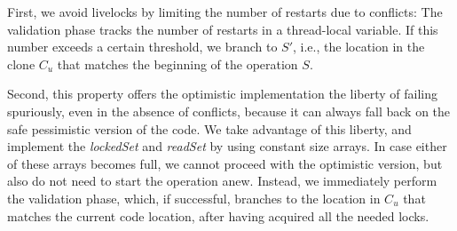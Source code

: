 First, we avoid livelocks by limiting the number of restarts due to conflicts:
The validation phase tracks the number of restarts in a thread-local variable.
If this number exceeds a certain threshold, we branch to $S'$, i.e., the location in the clone $C_u$ that matches
the beginning of the operation $S$.

Second, this property offers the optimistic implementation the liberty of
failing spuriously, even in the absence of conflicts, because it can always fall back on the safe pessimistic version
of the code.
We take advantage of this liberty, and implement the \emph{lockedSet} and \emph{readSet} by using constant size arrays.
In case either of these arrays becomes full, we cannot proceed with the optimistic version, but also
do not need to start the operation anew.
Instead, we immediately perform the validation phase, which, if successful, branches to the location in $C_u$
that matches the current code location, after having acquired all the needed locks.
